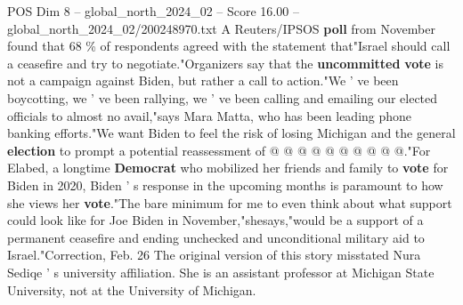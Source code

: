 \begin{textsample}{POS Dim 8 – global\_north\_2024\_02 – Score 16.00 – global\_north\_2024\_02/200248970.txt}
A Reuters/IPSOS \textbf{poll} from November found that 68 \% of respondents agreed with the statement that"Israel should call a ceasefire and try to negotiate."Organizers say that the \textbf{uncommitted} \textbf{vote} is not a campaign against Biden, but rather a call to action."We ' ve been boycotting, we ' ve been rallying, we ' ve been calling and emailing our elected officials to almost no avail,"says Mara Matta, who has been leading phone banking efforts."We want Biden to feel the risk of losing Michigan and the general \textbf{election} to prompt a potential reassessment of @ @ @ @ @ @ @ @ @ @."For Elabed, a longtime \textbf{Democrat} who mobilized her friends and family to \textbf{vote} for Biden in 2020, Biden ' s response in the upcoming months is paramount to how she views her \textbf{vote}."The bare minimum for me to even think about what support could look like for Joe Biden in November,"shesays,"would be a support of a permanent ceasefire and ending unchecked and unconditional military aid to Israel."Correction, Feb. 26 The original version of this story misstated Nura Sediqe ' s university affiliation.
She is an assistant professor at Michigan State University, not at the University of Michigan.

\end{textsample}
